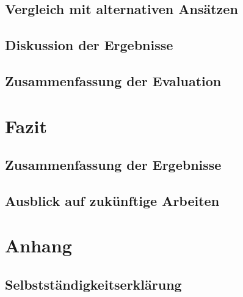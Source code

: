 \documentclass[a4paper,10pt,twoside]{report}
\begin{document}
\section{Vergleich mit alternativen Ansätzen}

\section{Diskussion der Ergebnisse}

\section{Zusammenfassung der Evaluation}

\chapter{Fazit}
\section{Zusammenfassung der Ergebnisse}
\section{Ausblick auf zukünftige Arbeiten}

\printbibliography[title={Literaturverzeichnis}]

\appendix
\chapter{Anhang}
\section*{Selbstständigkeitserklärung}
\end{document}
